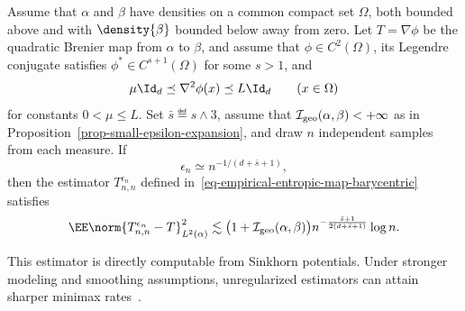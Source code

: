 \begin{prop}\label{prop-entropic-map-rate}
	Assume that \(\alpha\) and \(\beta\) have densities on a common compact set \(\Omega\), both bounded above and with \(\density{\beta}\) bounded below away from zero. Let \(T=\nabla\phi\) be the quadratic Brenier map from \(\alpha\) to \(\beta\), and assume that \(\phi\in C^2(\Omega)\), its Legendre conjugate satisfies \(\phi^*\in C^{s+1}(\Omega)\) for some \(s>1\), and
	\[
		\mu\Id_d\preceq\nabla^2\phi(x)\preceq L\Id_d
		\qquad (x\in\Omega)
	\]
	for constants \(0<\mu\leq L\). Set \(\bar s\eqdef s\wedge3\), assume that \(\mathcal I_{\rm geo}(\alpha,\beta)<+\infty\) as in Proposition~\ref{prop-small-epsilon-expansion}, and draw \(n\) independent samples from each measure. If
	\[
		\epsilon_n\simeq n^{-1/(d+\bar s+1)},
	\]
	then the estimator \(T_{n,n}^{\epsilon_n}\) defined in~\eqref{eq-empirical-entropic-map-barycentric} satisfies
	\[
		\EE\norm{T_{n,n}^{\epsilon_n}-T}_{L^2(\alpha)}^2
		\lesssim
		\bigl(1+\mathcal I_{\rm geo}(\alpha,\beta)\bigr)
		n^{-\frac{\bar s+1}{2(d+\bar s+1)}}\log n.
	\]
\end{prop}

This estimator is directly computable from Sinkhorn potentials. Under stronger modeling and smoothing assumptions, unregularized estimators can attain sharper minimax rates~\cite{hutter2021minimaxOTMaps,deb2021ratesBarycentricMaps,manole2021pluginOTMaps}.

